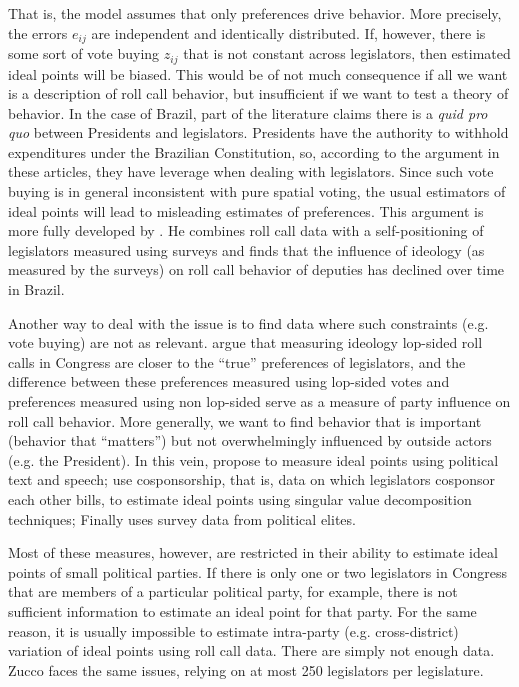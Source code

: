 That is, the model assumes that only preferences drive behavior. More precisely, the errors $e_{ij}$ are independent and identically distributed. If, however, there is some sort of vote buying $z_{ij}$ that is not constant across legislators, then estimated ideal points will be biased. This would be of not much consequence if all we want is a description of roll call behavior, but insufficient if we want to test a theory of behavior. In the case of Brazil, part of the literature claims there is a \emph{quid pro quo} between Presidents and legislators.\citep{alston:2006,alston:2007,zucco:2007} Presidents  have the authority to withhold expenditures under the Brazilian Constitution, so, according to the argument in these articles, they have leverage when dealing with legislators.  Since such vote buying is in general inconsistent with pure spatial voting, the usual estimators of ideal points will lead to misleading estimates of preferences. This argument is more fully developed by \citet{zucco:2009}. He combines roll call data with a self-positioning of legislators measured using surveys and finds that the influence of ideology (as measured by the surveys) on roll call behavior of deputies has declined over time in Brazil. 

Another way to deal with the issue is to find data where such constraints (e.g. vote buying) are not as relevant. \citet{groseclose:2000}  argue that measuring ideology lop-sided roll calls in Congress are closer to the ``true'' preferences of legislators, and the difference between these preferences measured using lop-sided votes and preferences measured using non lop-sided serve as a measure of party influence on roll call behavior. More generally, we want to find behavior that is important  (behavior that ``matters'') but not overwhelmingly influenced by outside actors (e.g. the President).  In this vein,  \citet{monroe:2008} propose to measure ideal points using political text and speech; \citet{aleman:2009} use cosponsorship, that is, data on which legislators cosponsor each other bills, to estimate ideal points using singular value decomposition techniques; Finally \citet{saiegh:2009} uses survey data from political elites. 

Most of these measures, however, are restricted in their ability to estimate ideal points of small political parties. If there is only one or two legislators in Congress  that are members of a particular political party, for example, there is not sufficient information to estimate an ideal point for that party. For the same reason, it is usually impossible to estimate intra-party (e.g. cross-district) variation of ideal points using roll call data. There are simply not enough data. Zucco faces the same issues, relying on at most 250 legislators per legislature.  

